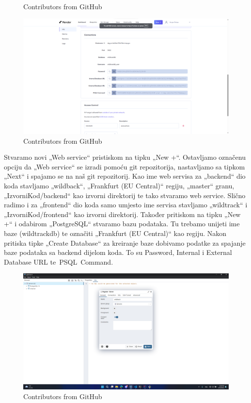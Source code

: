 {\begin{figure}[H]
		\centering
		\caption{Contributors from GitHub}
		\label{fig:contributors} %
	\end{figure}
	\begin{figure}[H]
		\includegraphics[scale=0.32]{slike/z.png} %
		\centering
		\caption{Contributors from GitHub}
		\label{fig:contributors} %
	\end{figure}
	Stvaramo novi „Web service“ pristiskom na tipku „New +“. Ostavljamo označenu opciju da „Web service“ se izradi pomoću git repozitorija,  nastavljamo sa tipkom „Next“ i spajamo se na naš git repozitorij. Kao ime web servisa za „backend“ dio koda stavljamo  „wildback“, „Frankfurt (EU Central)“ regiju, „master“ granu, „IzvorniKod/backend“ kao izvorni direktorij te tako stvaramo web service. Slično radimo i za „frontend“ dio koda samo umjesto ime servisa stavljamo „wildtrack“ i „IzvorniKod/frontend“ kao izvorni direktorij. Također pritiskom na tipku „New +“ i odabirom „PostgreSQL“ stvaramo bazu podataka. Tu trebamo unijeti ime baze (wildtrackdb) te označiti „Frankfurt (EU Central)“ kao regiju. Nakon pritiska tipke „Create Database“ za kreiranje baze dobivamo podatke za spajanje baze podataka sa backend dijelom koda. To su Password, Internal i External Database URL te PSQL Command.}
		\begin{figure}[H]
		\includegraphics[scale=0.32]{slike/a.png} %
		\centering
		\caption{Contributors from GitHub}
		\label{fig:contributors} %
	\end{figure}
